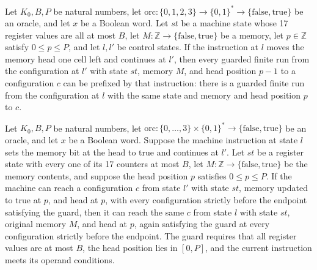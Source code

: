 \begin{lemma}
\label{Complexity.LogProg.ExpBFS.mleft_of}
\leanok
{}
Let $K_0,B,P$ be natural numbers, let
$\mathrm{orc}:\{0,1,2,3\}\to\{0,1\}^*\to\{\mathrm{false},\mathrm{true}\}$ be an oracle,
and let $x$ be a Boolean word. Let $st$ be a machine state whose 17 register values are
all at most $B$, let $M:\mathbb Z\to\{\mathrm{false},\mathrm{true}\}$ be a memory, let
$p\in\mathbb Z$ satisfy $0\le p\le P$, and let $l,l'$ be control states. If the
instruction at $l$ moves the memory head one cell left and continues at $l'$, then every
guarded finite run from the configuration at $l'$ with state $st$, memory $M$, and head
position $p-1$ to a configuration $c$ can be prefixed by that instruction: there is a
guarded finite run from the configuration at $l$ with the same state and memory and head
position $p$ to $c$.
\end{lemma}

\begin{lemma}
\label{Complexity.LogProg.ExpBFS.mset_of}
\leanok
{}
Let $K_0,B,P$ be natural numbers, let
$\mathrm{orc}:\{0,\ldots,3\}\times\{0,1\}^*\to\{\mathrm{false},\mathrm{true}\}$ be an
oracle, and let $x$ be a Boolean word. Suppose the machine instruction at state $l$ sets
the memory bit at the head to true and continues at $l'$. Let $st$ be a register state
with every one of its 17 counters at most $B$, let
$M:\mathbb{Z}\to\{\mathrm{false},\mathrm{true}\}$ be the memory contents, and suppose
the head position $p$ satisfies $0\le p\le P$. If the machine can reach a configuration
$c$ from state $l'$ with state $st$, memory updated to true at $p$, and head at $p$,
with every configuration strictly before the endpoint satisfying the guard, then it can
reach the same $c$ from state $l$ with state $st$, original memory $M$, and head at $p$,
again satisfying the guard at every configuration strictly before the endpoint. The
guard requires that all register values are at most $B$, the head position lies in
$[0,P]$, and the current instruction meets its operand conditions.
\end{lemma}

